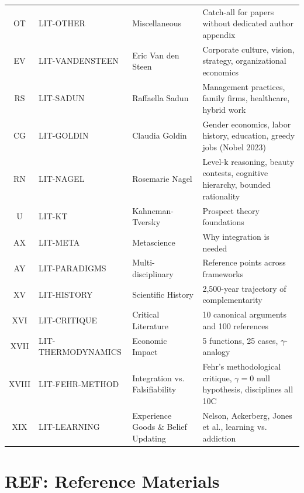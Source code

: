 \begin{table}[htbp]
\begin{tabular}{@{}cllp{5cm}@{}}
OT & LIT-OTHER & Miscellaneous & Catch-all for papers without dedicated author appendix \\
EV & LIT-VANDENSTEEN & Eric Van den Steen & Corporate culture, vision, strategy, organizational economics \\
RS & LIT-SADUN & Raffaella Sadun & Management practices, family firms, healthcare, hybrid work \\
CG & LIT-GOLDIN & Claudia Goldin & Gender economics, labor history, education, greedy jobs (Nobel 2023) \\
RN & LIT-NAGEL & Rosemarie Nagel & Level-k reasoning, beauty contests, cognitive hierarchy, bounded rationality \\

U & LIT-KT & Kahneman-Tversky & Prospect theory foundations \\
AX & LIT-META & Metascience & Why integration is needed \\
AY & LIT-PARADIGMS & Multi-disciplinary & Reference points across frameworks \\
XV & LIT-HISTORY & Scientific History & 2,500-year trajectory of complementarity \\
XVI & LIT-CRITIQUE & Critical Literature & 10 canonical arguments and 100 references \\
XVII & LIT-THERMODYNAMICS & Economic Impact & 5 functions, 25 cases, $\gamma$-analogy \\
XVIII & LIT-FEHR-METHOD & Integration vs. Falsifiability & Fehr's methodological critique, $\gamma = 0$ null hypothesis, disciplines all 10C \\
XIX & LIT-LEARNING & Experience Goods \& Belief Updating & Nelson, Ackerberg, Jones et al., learning vs. addiction \\
\bottomrule
\end{tabular}
\end{table}

\section{REF: Reference Materials}
\label{sec:index-ref}

